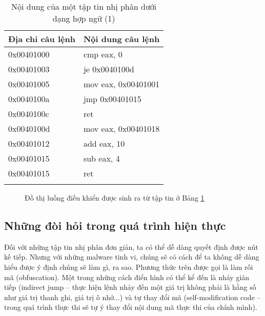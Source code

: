 \begin{longtable}{ | m{3cm} | m{5cm} | }
	\hline
Địa chỉ câu lệnh & Nội dung câu lệnh\\
	\hline
	\hline
0x00401000 & cmp eax, 0 \\
	\hline
0x00401003	& je 0x0040100d \\
	\hline
0x00401005 & mov eax, 0x00401001 \\
	\hline
0x0040100a & jmp 0x00401015 \\
	\hline
0x0040100c & ret \\
	\hline
0x0040100d & mov eax, 0x00401018 \\
	\hline
0x00401012 & add eax, 10 \\
	\hline
0x00401015 & sub eax, 4 \\
	\hline
0x00401015 & ret \\
	\hline

\caption{Nội dung của một tập tin nhị phân dưới dạng hợp ngữ (1)}
\label{table:tblexcfg}
\end{longtable}

\begin{figure}[H]
\centering
{}
\caption{Đồ thị luồng điều khiển được sinh ra từ tập tin ở Bảng \ref {table:tblexcfg}} 
\label{fig:imgexcfg}
\end{figure}

	\subsection{Những đòi hỏi trong quá trình hiện thực}

Đối với những tập tin nhị phân đơn giản, ta có thể dễ dàng quyết định được nút kế tiếp. Nhưng với những malware tinh vi, chúng sẽ có cách để ta không dễ dàng hiểu được ý định chúng sẽ làm gì, ra sao. Phương thức trên được gọi là làm rối mã (obfuscation). Một trong những cách điển hình có thể kể đến là nhảy gián tiếp (indirect jump -- thực hiện lệnh nhảy đến một giá trị không phải là hằng số như giá trị thanh ghi, giá trị ô nhớ...) và tự thay đổi mã (self-modification code -- trong quá trình thực thi sẽ tự ý thay đổi nội dung mã thực thi của chính mình).\\

